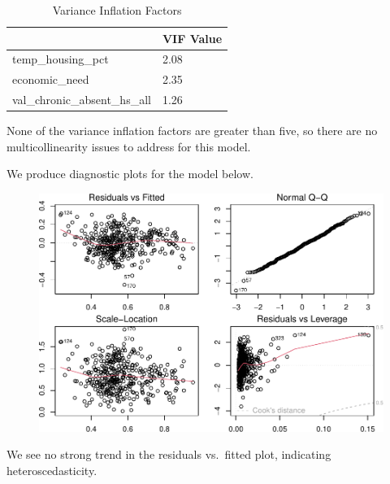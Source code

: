 \documentclass[
  man,floatsintext]{apa6}
\begin{document}
\begin{table}[H]

\begin{center}
\begin{threeparttable}

\caption{\label{tab:proxy-model-vif-check}Variance Inflation Factors}

\begin{tabular}{ll}
\toprule
 & \multicolumn{1}{c}{VIF Value}\\
\midrule
temp\_housing\_pct & 2.08\\
economic\_need & 2.35\\
val\_chronic\_absent\_hs\_all & 1.26\\
\bottomrule
\end{tabular}

\end{threeparttable}
\end{center}

\end{table}

None of the variance inflation factors are greater than five, so there are no multicollinearity issues to address for this model.

We produce diagnostic plots for the model below.

\begin{figure}[H]
\includegraphics[width=\textwidth]{final-project_files/figure-latex/plot-proxy-model-1} \caption{ }\label{fig:plot-proxy-model}
\end{figure}

We see no strong trend in the residuals vs.~fitted plot, indicating heteroscedasticity.
\end{document}
